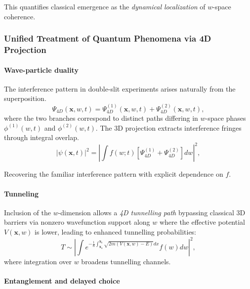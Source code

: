 \documentclass[12pt]{article}
\begin{document}
This quantifies classical emergence as the \emph{dynamical localization} of $w$-space coherence.

\vspace{1em}
\subsubsection*{Unified Treatment of Quantum Phenomena via 4D Projection}

\paragraph{Wave-particle duality}

The interference pattern in double-slit experiments arises naturally from the superposition.
\begin{equation}
\Psi_{4D}(\mathbf{x}, w, t) = \Psi^{(1)}_{4D}(\mathbf{x}, w, t) + \Psi^{(2)}_{4D}(\mathbf{x}, w, t),
\end{equation}
where the two branches correspond to distinct paths differing in $w$-space phases $\phi^{(1)}(w,t)$ and $\phi^{(2)}(w,t)$. The 3D projection extracts interference fringes through integral overlap.
\begin{equation}
|\psi(\mathbf{x}, t)|^2 = \left| \int f(w; t) [\Psi^{(1)}_{4D} + \Psi^{(2)}_{4D}] dw \right|^2,
\end{equation}

Recovering the familiar interference pattern with explicit dependence on $f$.

\paragraph{Tunneling}

Inclusion of the $w$-dimension allows a \emph{4D tunnelling path} bypassing classical 3D barriers via nonzero wavefunction support along $w$ where the effective potential $V(\mathbf{x}, w)$ is lower, leading to enhanced tunnelling probabilities:
\begin{equation}  
T \sim \left| \int e^{-\frac{1}{\hbar} \int_{\mathbf{x}_a}^{\mathbf{x}_b} \sqrt{2m (V(\mathbf{x}, w) - E)} dx} f(w) dw \right|^2,
\end{equation}
where integration over $w$ broadens tunnelling channels.

\paragraph{Entanglement and delayed choice}
\end{document}
